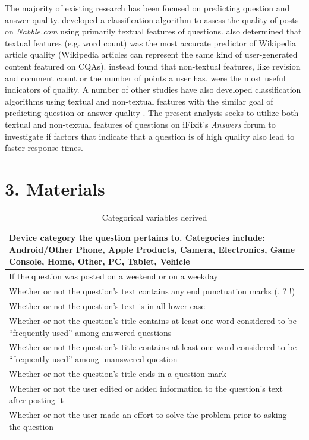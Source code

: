 \documentclass{article}
\begin{document}
The majority of existing research has been focused on predicting question and answer quality. \cite{Weimer2007} developed a classification algorithm to assess the quality of posts on \textit{Nabble.com} using primarily textual features of questions. \cite{Blumenstock} also determined that textual features (e.g. word count) was the most accurate predictor of Wikipedia article quality (Wikipedia articles can represent the same kind of user-generated content featured on CQAs). \cite{H.fu} instead found that non-textual features, like revision and comment count or the number of points a user has, were the most useful indicators of quality. A number of other studies have also developed classification algorithms using textual and non-textual features with the similar goal of predicting question or answer quality \cite{Yao2015} \cite{Toba2014} \cite{Ponzanelli2014a} \cite{Ravi2014}. The present analysis seeks to utilize both textual and non-textual features of questions on iFixit's \textit{Answers} forum to investigate if factors that indicate that a question is of high quality also lead to faster response times.


\section*{3. Materials}

\begin{table}[!htbp]
\centering
\begin{tabular}{|p{10cm}|}
  \hline
  Device category the question pertains to. Categories include: Android/Other Phone, Apple Products, Camera, Electronics, Game Console, Home, Other, PC, Tablet, Vehicle \\ \hline
  If the question was posted on a weekend or on a weekday \\ \hline
  Whether or not the question's text contains any end punctuation marks (. ? !) \\ \hline
  Whether or not the question's text is in all lower case \\ \hline
  Whether or not the question's title contains at least one word considered to be ``frequently used'' among answered questions \\ \hline
  Whether or not the question's title contains at least one word considered to be ``frequently used'' among unanswered question \\ \hline
  Whether or not the question's title ends in a question mark \\ \hline
  Whether or not the user edited or added information to the question's text after posting it \\ \hline
  Whether or not the user made an effort to solve the problem prior to asking the question \\ \hline
\end{tabular}
\caption{Categorical variables derived}
\label{table:categorical}
\end{table}
\end{document}
